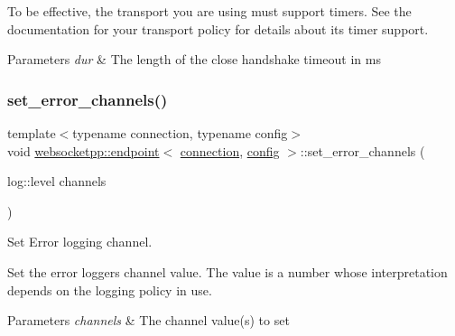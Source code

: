 To be effective, the transport you are using must support timers. See the documentation for your transport policy for details about its timer support.


\begin{DoxyParams}{Parameters}
{\em dur} & The length of the close handshake timeout in ms \\
\hline
\end{DoxyParams}
\mbox{\label{classwebsocketpp_1_1endpoint_a8292bcdca9344b57af1b0964ff7fc778}} 
\subsubsection{\texorpdfstring{set\+\_\+error\+\_\+channels()}{set\_error\_channels()}}
{\footnotesize\ttfamily template$<$typename connection, typename config$>$ \\
void \mbox{\hyperlink{classwebsocketpp_1_1endpoint}{websocketpp\+::endpoint}}$<$ \mbox{\hyperlink{classwebsocketpp_1_1connection}{connection}}, \mbox{\hyperlink{classconfig}{config}} $>$\+::set\+\_\+error\+\_\+channels (\begin{DoxyParamCaption}\item[{log\+::level}]{channels }\end{DoxyParamCaption})\hspace{0.3cm}{\ttfamily [inline]}}



Set Error logging channel. 

Set the error logger\textquotesingle{}s channel value. The value is a number whose interpretation depends on the logging policy in use.


\begin{DoxyParams}{Parameters}
{\em channels} & The channel value(s) to set \\
\hline
\end{DoxyParams}
\mbox{\label{classwebsocketpp_1_1endpoint_a00be7e08ca5c567dd2a4989b8d41d26b}} 
